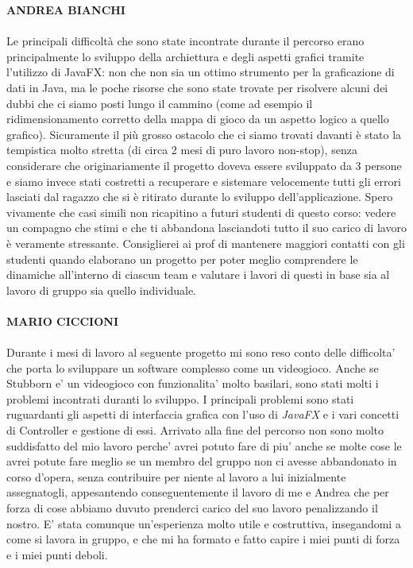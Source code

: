 \documentclass[a4paper,12pt]{report}
\begin{document}
\textbf{ANDREA BIANCHI}
\\ \\
Le principali difficoltà che sono state incontrate durante il percorso erano principalmente lo sviluppo della archiettura e degli aspetti grafici tramite l'utilizzo di JavaFX: non che non sia un ottimo strumento per la graficazione di dati in Java, ma le poche risorse che sono state trovate per risolvere alcuni dei dubbi che ci siamo posti lungo il cammino (come ad esempio il ridimensionamento corretto della mappa di gioco da un aspetto logico a quello grafico). Sicuramente il più grosso ostacolo che ci siamo trovati davanti è stato la tempistica molto stretta (di circa 2 mesi di puro lavoro non-stop), senza considerare che originariamente il progetto doveva essere sviluppato da 3 persone e siamo invece stati costretti a recuperare e sistemare velocemente tutti gli errori lasciati dal ragazzo che si è ritirato durante lo sviluppo dell'applicazione. Spero vivamente che casi simili non ricapitino a futuri studenti di questo corso: vedere un compagno che stimi e che ti abbandona lasciandoti tutto il suo carico di lavoro è veramente stressante. Consiglierei ai prof di mantenere maggiori contatti con gli studenti quando elaborano un progetto per poter meglio comprendere le dinamiche all'interno di ciascun team e valutare i lavori di questi in base sia al lavoro di gruppo sia quello individuale.
\\ \\
\textbf{MARIO CICCIONI}
\\ \\
Durante i mesi di lavoro al seguente progetto mi sono reso conto delle difficolta' che porta lo sviluppare un software complesso come un videogioco. Anche se Stubborn e' un videogioco con funzionalita' molto basilari, sono stati molti i problemi incontrati duranti lo sviluppo. I principali problemi sono stati ruguardanti gli aspetti di interfaccia grafica con l'uso di \textit{JavaFX} e i vari concetti di Controller e gestione di essi. Arrivato alla fine del percorso non sono molto suddisfatto del mio lavoro perche' avrei potuto fare di piu' anche se molte cose le avrei potute fare meglio se un membro del gruppo non ci avesse abbandonato in corso d'opera, senza contribuire per niente al lavoro a lui inizialmente assegnatogli, appesantendo conseguentemente il lavoro di me e Andrea che per forza di cose abbiamo duvuto prenderci carico del suo lavoro penalizzando il nostro. E' stata comunque un'esperienza molto utile e costruttiva, insegandomi a come si lavora in gruppo, e che mi ha formato e fatto capire i miei punti di forza e i miei punti deboli.  
\appendix
\end{document}
